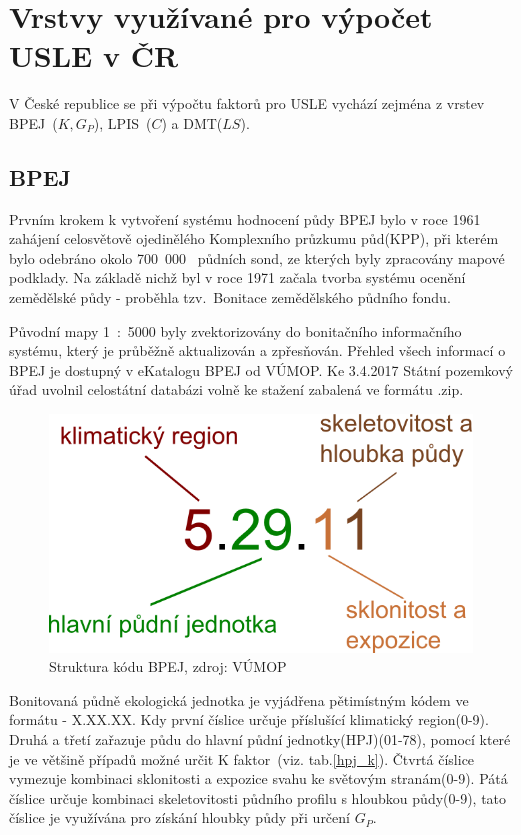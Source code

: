 \section{Vrstvy využívané pro výpočet USLE v ČR}
V České republice se při výpočtu faktorů pro USLE vychází zejména z vrstev BPEJ~($K, G_P$), LPIS~($C$) a DMT($LS$).
\subsection{BPEJ}
Prvním krokem k vytvoření systému hodnocení půdy BPEJ bylo v roce 1961 zahájení celosvětově ojedinělého Komplexního průzkumu půd(KPP), při kterém bylo odebráno okolo 700~000~ půdních sond, ze kterých byly zpracovány mapové podklady. Na základě nichž byl v roce 1971 začala tvorba systému ocenění zemědělské půdy - proběhla tzv.~Bonitace zemědělského půdního fondu.

Původní mapy 1~:~5000 byly zvektorizovány do bonitačního informačního systému, který je průběžně aktualizován a zpřesňován. Přehled všech informací o BPEJ je dostupný v eKatalogu BPEJ od VÚMOP\cite{bpej_vumop}. Ke 3.4.2017 Státní pozemkový úřad uvolnil celostátní databázi volně ke stažení zabalená ve formátu .zip\cite{spucr}.
\begin{figure}[H]
    \centering
      \includegraphics[scale=0.5]{./pictures/Struktura_BPEJ.png}
      \caption[Struktura kódu BPEJ]{Struktura kódu BPEJ, zdroj: VÚMOP\cite{bpej_vumop}}
      \label{fig:struktura_bpej}
\end{figure}
Bonitovaná půdně ekologická jednotka je vyjádřena pětimístným kódem ve formátu - X.XX.XX. Kdy první číslice určuje příslušící klimatický region(0-9). Druhá a třetí zařazuje půdu do hlavní půdní jednotky(HPJ)(01-78), pomocí které je ve většině případů možné určit K faktor~(viz. tab.\ref{hpj_k}). Čtvrtá číslice vymezuje kombinaci sklonitosti a expozice svahu ke světovým stranám(0-9). Pátá číslice určuje kombinaci skeletovitosti půdního profilu s hloubkou půdy(0-9), tato číslice je využívána pro získání hloubky půdy při určení $G_P$.\cite{Novotny2013}
